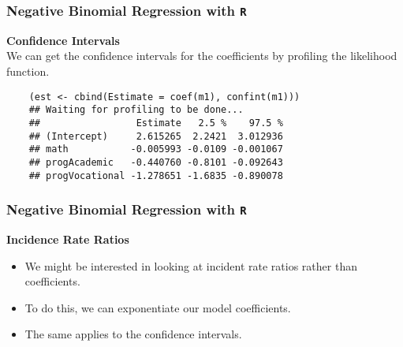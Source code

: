 \documentclass[MASTER.tex]{subfiles}
\begin{document}
%	
\begin{frame}[fragile]
	\frametitle{Negative Binomial Regression with \texttt{R} }
	\Large
	\textbf{Confidence Intervals}\\
	We can get the confidence intervals for the coefficients by profiling the likelihood function.
	{
		\large
	\begin{verbatim}
	(est <- cbind(Estimate = coef(m1), confint(m1)))
	## Waiting for profiling to be done...
	##                 Estimate   2.5 %    97.5 %
	## (Intercept)     2.615265  2.2421  3.012936
	## math           -0.005993 -0.0109 -0.001067
	## progAcademic   -0.440760 -0.8101 -0.092643
	## progVocational -1.278651 -1.6835 -0.890078
	\end{verbatim}
}
\end{frame}
\begin{frame}[fragile]
	\frametitle{Negative Binomial Regression with \texttt{R} }
	\Large
\textbf{Incidence Rate Ratios}
\begin{itemize}
\item	We might be interested in looking at incident rate ratios rather than coefficients. 
\item To do this, we can exponentiate our model coefficients. 
\item The same applies to the confidence intervals.
\end{itemize}
\end{frame}
\end{document}
